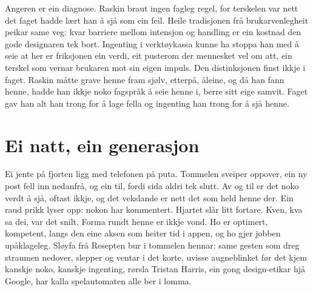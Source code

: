 Angeren er ein diagnose. Raskin braut ingen fagleg regel, for terskelen var nett det faget hadde lært han å sjå som ein feil. Heile tradisjonen frå brukarvenlegheit peikar same veg: kvar barriere mellom intensjon og handling er ein kostnad den gode designaren tek bort. Ingenting i verktøykassa kunne ha stoppa han med å seie at her er friksjonen ein verdi, eit pusterom der mennesket vel om att, ein terskel som vernar brukaren mot sin eigen impuls. Den distinksjonen finst ikkje i faget. Raskin måtte grave henne fram sjølv, etterpå, åleine, og då han fann henne, hadde han ikkje noko fagspråk å seie henne i, berre sitt eige samvit. Faget gav han alt han trong for å lage fella og ingenting han trong for å sjå henne.

\section{Ei natt, ein generasjon}

Ei jente på fjorten ligg med telefonen på puta. Tommelen sveiper oppover, ein ny post fell inn nedanfrå, og ein til, fordi sida aldri tek slutt. Av og til er det noko verdt å sjå, oftast ikkje, og det vekslande er nett det som held henne der. Ein raud prikk lyser opp: nokon har kommentert. Hjartet slår litt fortare. Kven, kva sa dei, var det snilt. Forma rundt henne er ikkje vond. Ho er optimert, kompetent, langs den eine aksen som heiter tid i appen, og ho gjer jobben upåklageleg. Sløyfa frå Resepten bur i tommelen hennar: same gesten som dreg straumen nedover, slepper og ventar i det korte, uvisse augneblinket før det kjem kanskje noko, kanskje ingenting, rørsla Tristan Harris, ein gong design-etikar hjå Google, har kalla spelautomaten alle ber i lomma.

